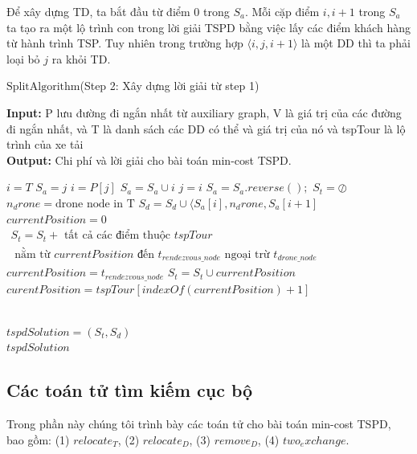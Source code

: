 \documentclass[a4paper,12pt]{report}
\begin{document}
Để xây dựng TD, ta bắt đầu từ điểm 0 trong $S_a$. Mỗi cặp điểm $i,i+1$ trong  $S_a$ ta tạo ra một lộ trình con trong lời giải TSPD bằng việc lấy  các điểm khách hàng từ hành trình TSP. Tuy nhiên trong trường hợp $\langle i,j,i+1 \rangle$ là một DD thì ta phải loại bỏ $j$ ra khỏi TD.

\begin{algorithm}[H]
\caption{$\text{SplitAlgorithm}$(Step 2: Xây dựng lời giải từ step 1)}
\textbf{Input:} P lưu đường đi ngắn nhất từ auxiliary graph, V là giá trị của các đường đi ngắn nhất, và T là danh sách các DD có thể và giá trị của nó và tspTour là lộ trình của xe tải\\
\textbf{Output:} Chi phí và lời giải cho bài toán min-cost TSPD.
\begin{algorithmic}[1]
\State $i=T$
\State $S_a=j$
\State $i=P[j]$
\State $S_a=S_a \cup i$
\State $j=i $  
\EndWhile
\State $S_a=S_a.reverse();$
\State $S_t=\oslash$ 
\State $n_drone=\text{drone node in T} $ 
\State $S_d=S_d \cup \langle S_a[i],n_drone,S_a[i+1]$
\EndIf
\EndFor 
\State $currentPosition=0$
\State $\begin{array}{l}  S_t=S_t+ \text{ tất cả các điểm thuộc } tspTour \\ \text{ nằm từ } currentPosition \text{ đến } t_{ rendezvous\_node }\text{ ngoại trừ } t_{ drone\_node } \end{array}$
\State $currentPosition=t_{rendezvous\_node}$
\Else
\State $S_t=S_t \cup currentPosition $
\State $curentPosition=tspTour[indexOf(currentPosition)+1]$
\EndIf

\EndWhile\\
\State $tspdSolution=(S_t,S_d)$\\
\Return $tspdSolution$
\end{algorithmic}
\label{alg:SPLIT2}
\end{algorithm}
\subsection{Các toán tử tìm kiếm cục bộ}
Trong phần này chúng tôi trình bày các toán tử  cho bài toán min-cost TSPD, bao gồm: (1) $relocate_T$, (2) $relocate_D$, (3) $remove_D$, (4) $two_exchange$. \\
\end{document}
